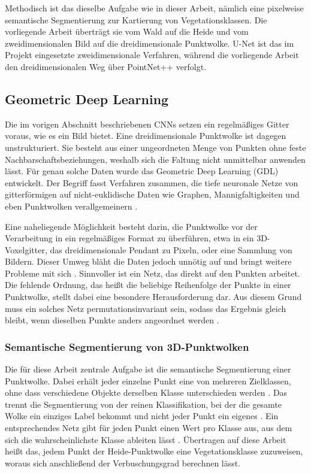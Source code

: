 Methodisch ist das dieselbe Aufgabe wie in dieser Arbeit, nämlich eine pixelweise semantische Segmentierung zur Kartierung von Vegetationsklassen. Die vorliegende Arbeit überträgt sie vom Wald auf die Heide und vom zweidimensionalen Bild auf die dreidimensionale Punktwolke. U-Net ist das im Projekt eingesetzte zweidimensionale Verfahren, während die vorliegende Arbeit den dreidimensionalen Weg über PointNet++ verfolgt.

\subsection{Geometric Deep Learning}\label{geometric_deep_learning}

Die im vorigen Abschnitt beschriebenen CNNs setzen ein regelmäßiges Gitter voraus, wie es ein Bild bietet. Eine dreidimensionale Punktwolke ist dagegen unstrukturiert. Sie besteht aus einer ungeordneten Menge von Punkten ohne feste Nachbarschaftsbeziehungen, weshalb sich die Faltung nicht unmittelbar anwenden lässt. Für genau solche Daten wurde das Geometric Deep Learning (GDL) entwickelt. Der Begriff fasst Verfahren zusammen, die tiefe neuronale Netze von gitterförmigen auf nicht-euklidische Daten wie Graphen, Mannigfaltigkeiten und eben Punktwolken verallgemeinern \cite{Bronstein.2017}. 

Eine naheliegende Möglichkeit besteht darin, die Punktwolke vor der Verarbeitung in ein regelmäßiges Format zu überführen, etwa in ein 3D-Voxelgitter, das dreidimensionale Pendant zu Pixeln, oder eine Sammlung von Bildern. Dieser Umweg bläht die Daten jedoch unnötig auf und bringt weitere Probleme mit sich \cite{Qi.2017a}. Sinnvoller ist ein Netz, das direkt auf den Punkten arbeitet. Die fehlende Ordnung, das heißt die beliebige Reihenfolge der Punkte in einer Punktwolke, stellt dabei eine besondere Herausforderung dar. Aus diesem Grund muss ein solches Netz permutationsinvariant sein, sodass das Ergebnis gleich bleibt, wenn dieselben Punkte anders angeordnet werden \cite{Qi.2017a}.

\subsubsection{Semantische Segmentierung von 3D-Punktwolken}

Die für diese Arbeit zentrale Aufgabe ist die semantische Segmentierung einer Punktwolke. Dabei erhält jeder einzelne Punkt eine von mehreren Zielklassen, ohne dass verschiedene Objekte derselben Klasse unterschieden werden \cite{Diab.2022}. Das trennt die Segmentierung von der reinen Klassifikation, bei der die gesamte Wolke ein einziges Label bekommt und nicht jeder Punkt ein eigenes \cite{Qi.2017a}. Ein entsprechendes Netz gibt für jeden Punkt einen Wert pro Klasse aus, aus dem sich die wahrscheinlichste Klasse ableiten lässt \cite{Qi.2017a}. Übertragen auf diese Arbeit heißt das, jedem Punkt der Heide-Punktwolke eine Vegetationsklasse zuzuweisen, woraus sich anschließend der Verbuschungsgrad berechnen lässt. 

